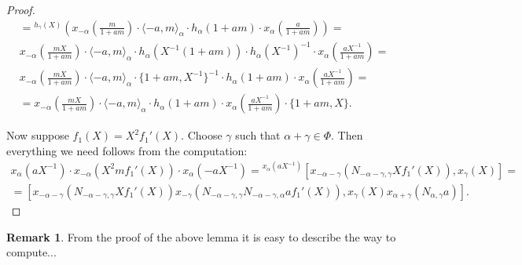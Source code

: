 \documentclass[oneside, 10pt]{amsart}
\theoremstyle{remark}
\theoremstyle{definition}
\newtheorem{rem}[lemma]{Remark}
\numberwithin{equation}{section}
\begin{document}
\begin{proof}
\begin{multline*}
 = {}^{h_\gamma(X)}\left( x_{-\alpha}\left(\frac{m}{1+am}\right) \cdot \langle -a, m\rangle_\alpha \cdot h_\alpha(1+am) \cdot x_\alpha\left(\frac{a}{1+am}\right) \right) = \\
 x_{-\alpha}\left(\frac{mX}{1+am}\right) \cdot \langle -a, m\rangle_\alpha \cdot h_\alpha(X^{-1}(1+am))\cdot h_\alpha(X^{-1})^{-1} \cdot x_{\alpha}\left(\frac{aX^{-1}}{1+am}\right) = \\
 x_{-\alpha}\left(\frac{mX}{1+am}\right) \cdot \langle -a, m\rangle_\alpha \cdot \{1+am, X^{-1}\}^{-1} \cdot h_\alpha(1+am)\cdot x_{\alpha}\left(\frac{aX^{-1}}{1+am}\right) = \\
 = x_{-\alpha}\left(\frac{mX}{1+am}\right) \cdot \langle -a, m\rangle_\alpha \cdot h_\alpha(1+am) \cdot x_{\alpha}\left(\frac{aX^{-1}}{1+am}\right) \cdot \{1+am, X\}.
\end{multline*}

Now suppose $f_1(X) = X^2f_1'(X)$. Choose $\gamma$ such that $\alpha + \gamma \in \Phi$.
Then everything we need follows from the computation:
\begin{multline*}
 x_\alpha(aX^{-1}) \cdot x_{-\alpha}(X^2 mf_1'(X)) \cdot x_\alpha(-aX^{-1}) = 
 {}^{x_\alpha(aX^{-1})}[x_{-\alpha - \gamma}(N_{-\alpha-\gamma, \gamma}Xf_1'(X)), x_{\gamma}(X)] = \\
 = [x_{-\alpha-\gamma}(N_{-\alpha-\gamma, \gamma}Xf_1'(X)) x_{-\gamma}(N_{-\alpha-\gamma, \gamma} N_{-\alpha-\gamma, \alpha} af_1'(X)), x_\gamma(X) x_{\alpha+\gamma}(N_{\alpha,\gamma}a)].
\end{multline*} 
\end{proof}

\begin{rem}
 From the proof of the above lemma it is easy to describe the way to compute... 
\end{rem}



\printbibliography
\end{document}
